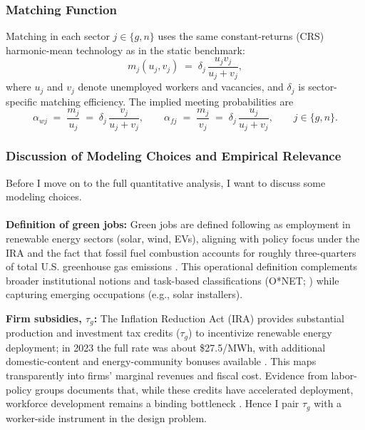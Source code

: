 \documentclass[preprint,12pt]{elsarticle}
\begin{document}
\subsubsection{Matching Function}
Matching in each sector \(j \in \{g,n\}\) uses the same constant-returns (CRS) harmonic-mean technology as in the static benchmark:
\[
m_j(u_j,v_j)\;=\;\delta_j\,\frac{u_j v_j}{u_j+v_j},
\]
where \(u_j\) and \(v_j\) denote unemployed workers and vacancies, and \(\delta_j\) is sector-specific matching efficiency. The implied meeting probabilities are
\begin{equation}
\alpha_{wj}\;=\;\frac{m_j}{u_j}\;=\;\delta_j\,\frac{v_j}{u_j+v_j},\qquad
\alpha_{fj}\;=\;\frac{m_j}{v_j}\;=\;\delta_j\,\frac{u_j}{u_j+v_j},\qquad j\in\{g,n\}.
\label{matching prof}
\end{equation}

\subsubsection{Discussion of Modeling Choices and Empirical Relevance}
\label{section model discussion}
Before I move on to the full quantitative analysis, I want to discuss some modeling choices. \\
\\
\noindent\textbf{Definition of green jobs:}
Green jobs are defined following \citet{curtis2022green} as employment in renewable energy sectors (solar, wind, EVs), aligning with policy focus under the IRA and the fact that fossil fuel combustion accounts for roughly three-quarters of total U.S. greenhouse gas emissions \citep{epa2024inventory,eia2024sources}. This operational definition complements broader institutional notions \citep{ilo2018weso} and task-based classifications (O*NET; \citealp{vona2018greenskills,consoli2016skills,vona2019measures}) while capturing emerging occupations (e.g., solar installers).
\medskip

\noindent\textbf{Firm subsidies, $\tau_g$:}
The Inflation Reduction Act (IRA) provides substantial production and investment tax credits (\(\tau_g\)) to incentivize renewable energy deployment; in 2023 the full rate was about \$27.5/MWh, with additional domestic-content and energy-community bonuses available \citep{epa_ira_summary,irs_domestic_content}. This maps transparently into firms’ marginal revenues and fiscal cost. Evidence from labor-policy groups documents that, while these credits have accelerated deployment, workforce development remains a binding bottleneck \citep{linkedin2024stocktake,bga_nsc_2024,bluegreen_2024_shortages}. Hence I pair $\tau_g$ with a worker-side instrument in the design problem.
\end{document}
